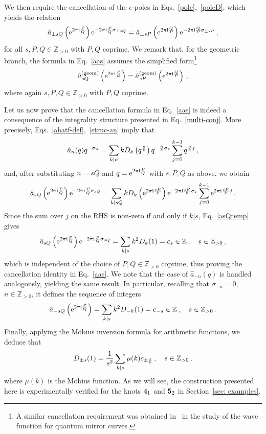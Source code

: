 \documentclass[a4paper,11pt]{article}
\theoremstyle{definition}
\def\IZ{{\mathbb Z}}
\def\e{\epsilon}
\newcommand{\re}{{\rm e}}
\newcommand{\ri}{{\rm i}}
\newcommand{\be}{\begin{equation}}
\newcommand{\ee}{\end{equation}}
\begin{document}
We then require the cancellation of the $\e$-poles in Eqs.~\eqref{pole},~\eqref{poleD}, which yields the relation
%
\be
\label{aas}
\hat a_{\pm sQ}\left(\re^{2 \pi \ri {P \over Q}} \right) \re^{- 2 \pi \ri {P \over Q} \sigma_{\pm sQ}} =  \hat a_{\pm sP} \left(\re^{2 \pi \ri {Q \over P}} \right) \re^{- 2 \pi \ri {Q \over P} \sigma_{\pm sP}} \, ,
 \ee
for all $s, P, Q \in \IZ_{>0}$ with $P,Q$ coprime.
We remark that, for the geometric branch, the formula in Eq.~\eqref{aas} assumes the simplified form\footnote{A similar cancellation requirement was obtained in~\cite{szabolcs} in the study of the wave function for quantum mirror curves.}
%
\be
\label{aas-geom}
\hat a^{(\rm{geom})}_{sQ}\left(\re^{2 \pi \ri {P \over Q}} \right)  =  \hat a^{(\rm{geom})}_{sP} \left(\re^{2 \pi \ri {Q \over P}} \right)  \, , 
 \ee
 where again $s, P, Q \in \IZ_{>0}$ with $P,Q$ coprime.
 
 Let us now prove that the cancellation formula in Eq.~\eqref{aas} is indeed a consequence of the integrality structure presented in Eq.~\eqref{multi-conj}. More precisely, Eqs.~\eqref{ahatf-def},~\eqref{struc-an} imply that
 \be \label{an-dec}
 \hat{a}_n(q) q^{-\sigma_n}= \sum_{k|n} k D_k \left( q^{n \over k} \right) q^{-{n \over k} \sigma_k} \sum_{j=0}^{k-1} q^{{n \over k}j} \, ,
 \ee
and, after substituting $n=sQ$ and $q = \re^{2 \pi \ri {P \over Q}}$ with $s, P, Q$ as above, we obtain
 \be \label{asQtemp}
 \hat{a}_{sQ}\left(\re^{2 \pi \ri {P \over Q}}\right) \re^{- 2 \pi \ri {P \over Q} \sigma_{sQ}}= \sum_{k| sQ} k D_k \left( \re^{2 \pi \ri \frac{sP}{k}} \right) \re^{- 2 \pi \ri \frac{sP}{k} \sigma_{k}} \sum_{j=0}^{k-1} \re^{2 \pi \ri \frac{sP}{k} j} \, .
 \ee
Since the sum over $j$ on the RHS is non-zero if and only if $k | s$, Eq.~\eqref{asQtemp} gives
\be  \label{cs-sequenceP}
 \hat{a}_{sQ}\left(\re^{2 \pi \ri {P \over Q}}\right) \re^{- 2 \pi \ri {P \over Q} \sigma_{sQ}}= \sum_{k| s} k^2 D_k (1) = c_s \in \IZ \, , \quad s \in \IZ_{>0} \, ,
 \ee
which is independent of the choice of $P,Q \in \IZ_{>0}$ coprime, thus proving the cancellation identity in Eq.~\eqref{aas}.
We note that the case of $\hat{a}_{-n}(q)$ is handled analogously, yielding the same result. In particular, recalling that $\sigma_{-n}=0$, $n \in \IZ_{>0}$, it defines the sequence of integers
\be  \label{cs-sequenceM}
 \hat{a}_{-sQ}\left(\re^{2 \pi \ri {P \over Q}}\right) = \sum_{k| s} k^2 D_{-k} (1) = c_{-s} \in \IZ \, , \quad s \in \IZ_{>0} \, .
\ee
 Finally, applying the M\"obius inversion formula for arithmetic functions, we deduce that
\be
D_{\pm s}(1)= {1\over s^2} \sum_{k|s} \mu(k) c_{\pm{ s \over k}} \, , \quad s \in \IZ_{>0} \, ,
\ee
%
where $\mu(k)$ is the M\"obius function. 
As we will see, the construction presented here is experimentally verified for the knots ${\bf 4}_1$ and ${\bf 5}_2$ in Section~\ref{sec: examples}.
\end{document}
